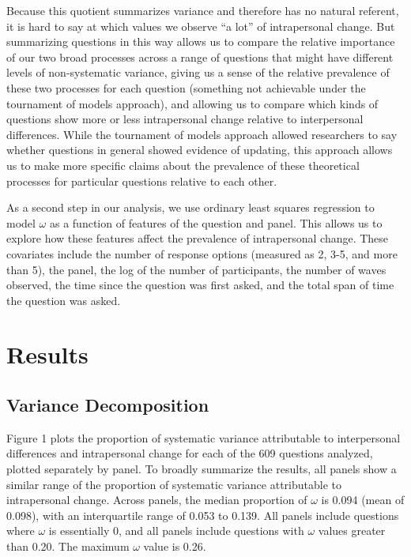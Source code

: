 \documentclass[
  12pt,
]{article}
\begin{document}
Because this quotient summarizes variance and therefore has no natural
referent, it is hard to say at which values we observe ``a lot'' of
intrapersonal change. But summarizing questions in this way allows us to
compare the relative importance of our two broad processes across a
range of questions that might have different levels of non-systematic
variance, giving us a sense of the relative prevalence of these two
processes for each question (something not achievable under the
tournament of models approach), and allowing us to compare which kinds
of questions show more or less intrapersonal change relative to
interpersonal differences. While the tournament of models approach
allowed researchers to say whether questions in general showed evidence
of updating, this approach allows us to make more specific claims about
the prevalence of these theoretical processes for particular questions
relative to each other.

As a second step in our analysis, we use ordinary least squares
regression to model \(\omega\) as a function of features of the question
and panel. This allows us to explore how these features affect the
prevalence of intrapersonal change. These covariates include the number
of response options (measured as 2, 3-5, and more than 5), the panel,
the log of the number of participants, the number of waves observed, the
time since the question was first asked, and the total span of time the
question was asked.

\hypertarget{results}{%
\section{Results}\label{results}}

\hypertarget{variance-decomposition}{%
\subsection{Variance Decomposition}\label{variance-decomposition}}

Figure 1 plots the proportion of systematic variance attributable to
interpersonal differences and intrapersonal change for each of the 609
questions analyzed, plotted separately by panel. To broadly summarize
the results, all panels show a similar range of the proportion of
systematic variance attributable to intrapersonal change. Across panels,
the median proportion of \(\omega\) is 0.094 (mean of 0.098), with an
interquartile range of 0.053 to 0.139. All panels include questions
where \(\omega\) is essentially 0, and all panels include questions with
\(\omega\) values greater than 0.20. The maximum \(\omega\) value is
0.26.
\end{document}
